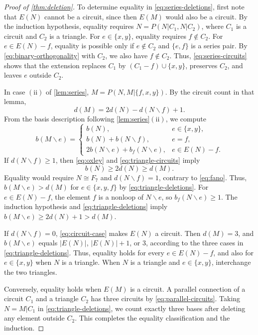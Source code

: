 \documentclass[10pt,a4paper]{article}
\numberwithin{equation}{section}
\begin{document}
\begin{proof}[Proof of \autoref{thm:deletion}]
To determine equality in \eqref{eq:series-deletions}, first note that
\(E(N)\) cannot be a circuit, since then \(E(M)\) would
also be a circuit. By the induction hypothesis, equality
requires \(N=P(N|C_1,N|C_2)\), where \(C_1\) is a circuit
and \(C_2\) is a triangle.
For \(e\in\{x,y\}\), equality requires \(f\notin C_2\).
For \(e\in E(N)-f\), equality is possible only if \(e\notin C_2\)
and \(\{e,f\}\) is a series pair. By \eqref{eq:binary-orthogonality} with \(C_2\),
we also have \(f\notin C_2\).
Thus, \eqref{eq:series-circuits} shows that the extension replaces \(C_1\) by
\((C_1-f)\cup\{x,y\}\), preserves \(C_2\), and leaves \(e\)
outside \(C_2\).

In case \(\mathrm{(ii)}\) of \autoref{lem:series},
\(M=P(N,M|\{f,x,y\})\). By the circuit count in that lemma,
\begin{equation}\label{eq:triangle-circuits}
 d(M)=2d(N)-d(N\backslash f)+1.
\end{equation}
From the basis description following \autoref{lem:series}\(\mathrm{(ii)}\),
we compute
\begin{equation}\label{eq:triangle-deletions}
 b(M\backslash e)=
 \begin{cases}
 b(N),&e\in\{x,y\},\\
 b(N)+b(N\backslash f),&e=f,\\
 2b(N\backslash e)+b_f(N\backslash e),&e\in E(N)-f.
 \end{cases}
\end{equation}
If \(d(N\backslash f)\ge1\), then \eqref{eq:oxley} and
\eqref{eq:triangle-circuits} imply
\[
 b(N)\ge2d(N)\ge d(M).
\]
Equality would require \(N\cong F_7\) and
\(d(N\backslash f)=1\), contrary to \eqref{eq:fano}.
Thus, \(b(M\backslash e)>d(M)\) for \(e\in\{x,y,f\}\)
by \eqref{eq:triangle-deletions}.
For \(e\in E(N)-f\), the element \(f\) is a nonloop of
\(N\backslash e\), so \(b_f(N\backslash e)\ge1\).
The induction hypothesis and \eqref{eq:triangle-deletions}
imply \(b(M\backslash e)\ge2d(N)+1>d(M)\).

If \(d(N\backslash f)=0\), \eqref{eq:circuit-case} makes
\(E(N)\) a circuit. Then \(d(M)=3\), and \(b(M\backslash e)\) equals
\(|E(N)|\), \(|E(N)|+1\), or \(3\), according to the three cases in
\eqref{eq:triangle-deletions}.
Thus, equality holds for every \(e\in E(N)-f\),
and also for \(e\in\{x,y\}\) when \(N\) is a triangle.
When \(N\) is a triangle and \(e\in\{x,y\}\), interchange the two triangles.

Conversely, equality holds when \(E(M)\) is a circuit. A parallel connection
of a circuit \(C_1\) and a triangle \(C_2\) has three circuits
by \eqref{eq:parallel-circuits}.
Taking \(N=M|C_1\) in \eqref{eq:triangle-deletions}, we count
exactly three bases after deleting any element outside \(C_2\).
This completes the equality classification and the induction.
\end{proof}
\end{document}
